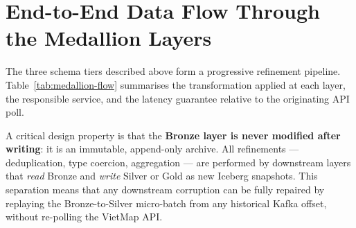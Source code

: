 \section{End-to-End Data Flow Through the Medallion Layers}
\label{sec:medallion-flow}

The three schema tiers described above form a progressive refinement
pipeline. Table~\ref{tab:medallion-flow} summarises the transformation
applied at each layer, the responsible service, and the latency
guarantee relative to the originating API poll.

\begin{table}[htbp]
\centering
\caption{Medallion data flow: transformation, ownership, and latency per layer.}
\label{tab:medallion-flow}
\end{table}

\noindent A critical design property is that the \textbf{Bronze layer is
never modified after writing}: it is an immutable, append-only archive.
All refinements --- deduplication, type coercion, aggregation --- are
performed by downstream layers that \textit{read} Bronze and
\textit{write} Silver or Gold as new Iceberg snapshots. This separation
means that any downstream corruption can be fully repaired by replaying
the Bronze-to-Silver micro-batch from any historical Kafka offset, without
re-polling the VietMap API.

